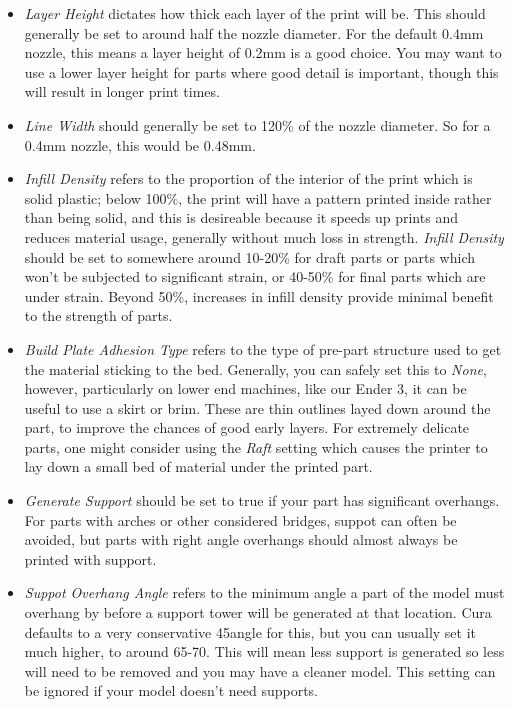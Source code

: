\documentclass[12pt]{report}
\begin{document}
\begin{itemize}
    \item \textit{Layer Height} dictates how thick each layer of the print will
        be. This should generally be set to around half the
        nozzle diameter. For the default 0.4mm nozzle, this means a layer height
        of 0.2mm is a good choice. You may want to use a lower layer height for
        parts where good detail is important, though this will result in longer
        print times.
    \item \textit{Line Width} should generally be set to 120\% of the nozzle
        diameter. So for a 0.4mm nozzle, this would be 0.48mm.
    \item \textit{Infill Density} refers to the proportion of the interior of
        the print which is solid plastic; below 100\%, the print will have a
        pattern printed inside rather than being solid, and this is desireable
        because it speeds up prints and reduces material usage, generally
        without much loss in strength. \textit{Infill Density} should be set
        to somewhere around 10-20\% for draft parts or parts which won't be
        subjected to significant strain, or 40-50\% for final parts which are
        under strain. Beyond 50\%, increases in infill density provide minimal
        benefit to the strength of parts.
    \item \textit{Build Plate Adhesion Type} refers to the type of pre-part
        structure used to get the material sticking to the bed. Generally, you
        can safely set this to \textit{None}, however, particularly on lower end
        machines, like our Ender 3, it can be useful to use a skirt or brim.
        These are thin outlines layed down around the part, to improve the
        chances of good early layers. For extremely delicate parts, one might
        consider using the \textit{Raft} setting which causes the printer to lay
        down a small bed of material under the printed part.
    \item \textit{Generate Support} should be set to true if your part has
        significant overhangs. For parts with arches or other considered
        bridges, suppot can often be avoided, but parts with right angle
        overhangs should almost always be printed with support.
    \item \textit{Suppot Overhang Angle} refers to the minimum angle a part of
        the model must overhang by before a support tower will be generated at
        that location. Cura defaults to a very conservative 45\textdegree angle
        for this, but you can usually set it much higher, to around
        65-70\textdegree. This will mean less support is generated so less will
        need to be removed and you may have a cleaner model. This setting can be
        ignored if your model doesn't need supports.
\end{itemize}
\end{document}
